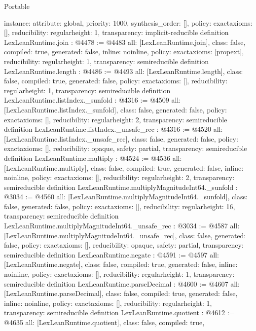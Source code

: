 \begin{lexlean}{Portable}
\begin{coremodule}
{  instance: {attribute: global, priority: 1000, synthesis_order: []},
  policy: exact{axioms: []},
  reducibility: regular{height: 1},
  transparency: implicit-reducible
}
definition LexLeanRuntime.join : @4478 := @4483 {
  all: [LexLeanRuntime.join],
  class: false,
  compiled: true,
  generated: false,
  inline: noinline,
  policy: exact{axioms: [propext]},
  reducibility: regular{height: 1},
  transparency: semireducible
}
definition LexLeanRuntime.length : @4486 := @4493 {
  all: [LexLeanRuntime.length],
  class: false,
  compiled: true,
  generated: false,
  policy: exact{axioms: []},
  reducibility: regular{height: 1},
  transparency: semireducible
}
definition LexLeanRuntime.listIndex._sunfold : @4316 := @4509 {
  all: [LexLeanRuntime.listIndex._sunfold],
  class: false,
  generated: false,
  policy: exact{axioms: []},
  reducibility: regular{height: 2},
  transparency: semireducible
}
definition LexLeanRuntime.listIndex._unsafe_rec : @4316 := @4520 {
  all: [LexLeanRuntime.listIndex._unsafe_rec],
  class: false,
  generated: false,
  policy: exact{axioms: []},
  reducibility: opaque{},
  safety: partial,
  transparency: semireducible
}
definition LexLeanRuntime.multiply : @4524 := @4536 {
  all: [LexLeanRuntime.multiply],
  class: false,
  compiled: true,
  generated: false,
  inline: noinline,
  policy: exact{axioms: []},
  reducibility: regular{height: 2},
  transparency: semireducible
}
definition LexLeanRuntime.multiplyMagnitudeInt64._sunfold : @3034 := @4560 {
  all: [LexLeanRuntime.multiplyMagnitudeInt64._sunfold],
  class: false,
  generated: false,
  policy: exact{axioms: []},
  reducibility: regular{height: 16},
  transparency: semireducible
}
definition LexLeanRuntime.multiplyMagnitudeInt64._unsafe_rec : @3034 := @4587 {
  all: [LexLeanRuntime.multiplyMagnitudeInt64._unsafe_rec],
  class: false,
  generated: false,
  policy: exact{axioms: []},
  reducibility: opaque{},
  safety: partial,
  transparency: semireducible
}
definition LexLeanRuntime.negate : @4591 := @4597 {
  all: [LexLeanRuntime.negate],
  class: false,
  compiled: true,
  generated: false,
  inline: noinline,
  policy: exact{axioms: []},
  reducibility: regular{height: 1},
  transparency: semireducible
}
definition LexLeanRuntime.parseDecimal : @4600 := @4607 {
  all: [LexLeanRuntime.parseDecimal],
  class: false,
  compiled: true,
  generated: false,
  inline: noinline,
  policy: exact{axioms: []},
  reducibility: regular{height: 1},
  transparency: semireducible
}
definition LexLeanRuntime.quotient : @4612 := @4635 {
  all: [LexLeanRuntime.quotient],
  class: false,
  compiled: true,
}
\end{coremodule}
\end{lexlean}

